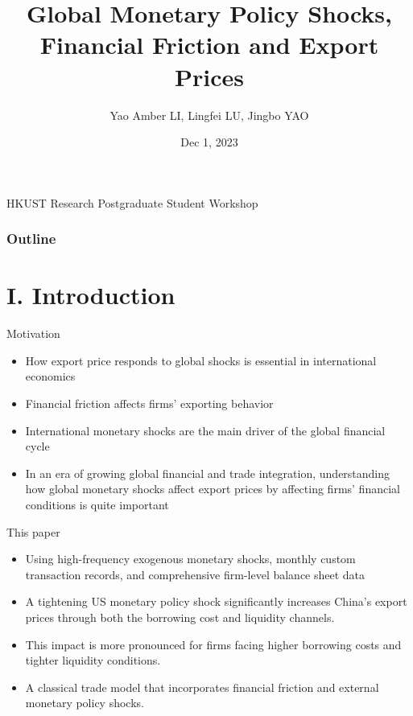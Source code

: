 \documentclass[10pt]{beamer}
\begin{document}
\title{Global Monetary Policy Shocks, Financial Friction and Export Prices}
\author[Yao Amber LI, Lingfei LU and Jingbo YAO]{Yao Amber LI, Lingfei LU, Jingbo YAO}
\date{Dec 1, 2023}

\begin{frame}
\maketitle
\centering
HKUST Research Postgraduate Student Workshop
\end{frame}

\begin{frame}
\frametitle{Outline}
\tableofcontents
\end{frame}

\section{I. Introduction}

\begin{frame}{Motivation}
\begin{itemize}
    \item How export price responds to global shocks is essential in international economics
    \medskip
    \item Financial friction affects firms' exporting behavior
    \medskip
    \item International monetary shocks are the main driver of the global financial cycle
    \medskip
    \item  In an era of growing global financial and trade integration, understanding how global monetary shocks affect export prices by affecting firms' financial conditions is quite important
    \medskip

\end{itemize}
\end{frame}

\begin{frame}{This paper}
\begin{itemize}
    \item Using high-frequency exogenous monetary shocks, monthly custom transaction records, and comprehensive firm-level balance sheet data
    \medskip
    \item  A tightening US monetary policy shock significantly increases China's export prices through both the borrowing cost and liquidity channels.
    \medskip
    \item This impact is more pronounced for firms facing higher borrowing costs and tighter liquidity conditions. 
    \medskip
    \item A classical trade model that incorporates financial friction and external monetary policy shocks.
\end{itemize}
\end{frame}
\end{document}

